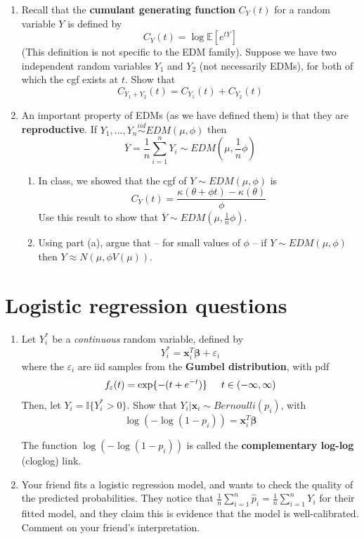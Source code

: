 \documentclass[11pt]{article}
\begin{document}
\begin{enumerate}
\bigskip

\item Recall that the \textbf{cumulant generating function} $C_Y(t)$ for a random variable $Y$ is defined by
$$C_Y(t) = \log \mathbb{E}[e^{tY}]$$
(This definition is not specific to the EDM family). Suppose we have two independent random variables $Y_1$ and $Y_2$ (not necessarily EDMs), for both of which the cgf exists at $t$. Show that
$$C_{Y_1 + Y_2}(t) = C_{Y_1}(t) + C_{Y_2}(t)$$

\bigskip

\item An important property of EDMs (as we have defined them) is that they are \textbf{reproductive}. If $Y_1,...,Y_n \overset{iid}{\sim} EDM(\mu, \phi)$ then
$$\overline{Y} = \frac{1}{n} \sum \limits_{i=1}^n Y_i \sim EDM\left(\mu, \frac{1}{n}\phi\right)$$

\begin{enumerate}
\item In class, we showed that the cgf of $Y \sim EDM(\mu, \phi)$ is 
$$C_Y(t) = \frac{\kappa(\theta + \phi t) - \kappa(\theta)}{\phi}$$
Use this result to show that $\overline{Y} \sim EDM\left(\mu, \frac{1}{n}\phi\right)$.

\item Using part (a), argue that -- for small values of $\phi$ -- if $Y \sim EDM(\mu, \phi)$ then $Y \approx N(\mu, \phi V(\mu))$.
\end{enumerate}

\end{enumerate}

\section*{Logistic regression questions}

\begin{enumerate}
\item[7.] Let $Y_i^*$ be a \textit{continuous} random variable, defined by
$$Y_i^* = \mathbf{x}_i^T \boldsymbol{\beta} + \varepsilon_i$$
where the $\varepsilon_i$ are iid samples from the \textbf{Gumbel distribution}, with pdf 
$$f_{\varepsilon}(t) = \exp\{-(t + e^{-t})\} \hspace{0.5cm} t \in (-\infty, \infty)$$
Then, let $Y_i = \mathbb{I}\{Y_i^* > 0\}$. Show that $Y_i | \mathbf{x}_i \sim Bernoulli(p_i)$, with
$$\log(-\log(1 - p_i)) = \mathbf{x}_i^T \boldsymbol{\beta}$$

The function $\log(-\log(1 - p_i))$ is called the \textbf{complementary log-log} (cloglog) link.

\bigskip

\item[8.] Your friend fits a logistic regression model, and wants to check the quality of the predicted probabilities. They notice that $\frac{1}{n} \sum \limits_{i=1}^n \widehat{p}_i = \frac{1}{n} \sum \limits_{i=1}^n Y_i$ for their fitted model, and they claim this is evidence that the model is well-calibrated. Comment on your friend's interpretation.
\end{enumerate}
\end{document}
